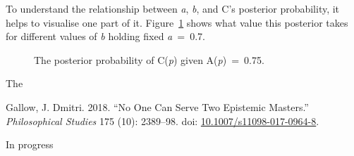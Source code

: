 \documentclass[
  10pt,
  letterpaper,
  DIV=11,
  numbers=noendperiod,
  twoside]{scrartcl}
\newlength{\cslhangindent}
\newenvironment{CSLReferences}[2] %
 {\begin{list}{}{%
  \setlength{\itemindent}{0pt}
  \setlength{\leftmargin}{0pt}
  \setlength{\parsep}{0pt}
  \ifodd #1
   \setlength{\leftmargin}{\cslhangindent}
   \setlength{\itemindent}{-1\cslhangindent}
  \fi
  \setlength{\itemsep}{#2\baselineskip}}}
 {\end{list}}
\begin{document}
To understand the relationship between \emph{a}, \emph{b}, and C's
posterior probability, it helps to visualise one part of it.
Figure~\ref{fig-two-experts} shows what value this posterior takes for
different values of \emph{b} holding fixed \emph{a}~=~0.7.

\begin{figure}


\caption{\label{fig-two-experts}The posterior probability of C(\emph{p})
given A(\emph{p})~=~0.75.}

\end{figure}%

The

\label{refs}
\begin{CSLReferences}{1}{0}
Gallow, J. Dmitri. 2018. {``No One Can Serve Two Epistemic Masters.''}
\emph{Philosophical Studies} 175 (10): 2389--98. doi:
\href{https://doi.org/10.1007/s11098-017-0964-8}{10.1007/s11098-017-0964-8}.

\end{CSLReferences}



\noindent \vspace{1in} In progress
\end{document}
